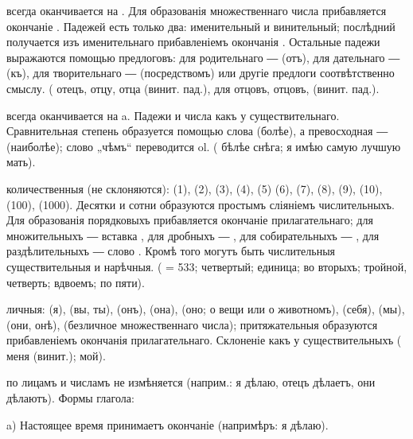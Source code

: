      всегда оканчивается на . Для образованія множественнаго числа прибавляется окончаніе . Падежей есть только два: именительный и винительный; послѣдний получается изъ именительнаго прибавленіемъ окончанія . Остальные падежи выражаются помощью предлоговъ: для родительнаго ―  (отъ), для дательнаго ―  (къ), для творительнаго ―  (посредствомъ) или другіе предлоги соотвѣтственно смыслу. (  отецъ,  отцу,  отца (винит. пад.),  для отцовъ,  отцовъ, (винит. пад.).
    
     всегда оканчивается на a. Падежи и числа какъ у существительнаго. Сравнительная степень образуется помощью слова  (болѣе), а превосходная ―  (наиболѣе); слово „чѣмъ“ переводится ol. (  бѣлѣе снѣга;  я имѣю самую лучшую мать).
    
     количественныя (не склоняются):  (1),  (2),  (3),  (4),  (5)  (6),  (7),  (8),  (9),  (10),  (100),  (1000). Десятки и сотни образуются простымъ сліяніемъ числительныхъ. Для образованія порядковыхъ прибавляется окончаніе прилагательнаго; для множительныхъ ― вставка , для дробныхъ ― , для собирательныхъ ― , для раздѣлительныхъ ― слово . Кромѣ того могутъ быть числительныя существительныя и нарѣчныя. (  = 533;  четвертый;  единица;  во вторыхъ;  тройной,  четверть;  вдвоемъ;  по пяти).
    
     личныя:  (я),  (вы, ты),  (онъ),  (она),  (оно; о вещи или о животномъ),  (себя),  (мы),  (они, онѣ),  (безличное множественнаго числа); притяжательныя образуются прибавленіемъ окончанія прилагательнаго. Склоненіе какъ у существительныхъ (  меня (винит.);  мой).
    
     по лицамъ и числамъ не измѣняется (наприм.:  я дѣлаю,  отецъ дѣлаетъ,  они дѣлаютъ). Формы глагола:
    
        a) Настоящее время принимаетъ окончаніе  (напримѣръ:  я дѣлаю).
        
